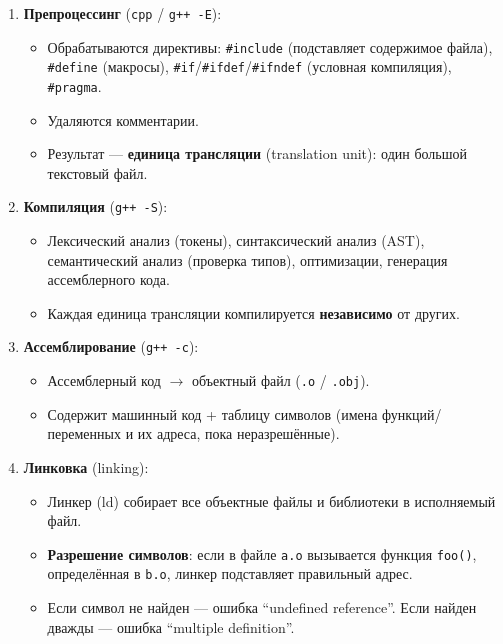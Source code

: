 \documentclass[12pt,a4paper]{article}
\begin{document}
\begin{enumerate}
    \item \textbf{Препроцессинг} (\texttt{cpp} / \texttt{g++ -E}):
    \begin{itemize}
        \item Обрабатываются директивы: \texttt{\#include} (подставляет содержимое файла), \texttt{\#define} (макросы), \texttt{\#if}/\texttt{\#ifdef}/\texttt{\#ifndef} (условная компиляция), \texttt{\#pragma}.
        \item Удаляются комментарии.
        \item Результат --- \textbf{единица трансляции} (translation unit): один большой текстовый файл.
    \end{itemize}

    \item \textbf{Компиляция} (\texttt{g++ -S}):
    \begin{itemize}
        \item Лексический анализ (токены), синтаксический анализ (AST), семантический анализ (проверка типов), оптимизации, генерация ассемблерного кода.
        \item Каждая единица трансляции компилируется \textbf{независимо} от других.
    \end{itemize}

    \item \textbf{Ассемблирование} (\texttt{g++ -c}):
    \begin{itemize}
        \item Ассемблерный код $\to$ объектный файл (\texttt{.o} / \texttt{.obj}).
        \item Содержит машинный код + таблицу символов (имена функций/переменных и их адреса, пока неразрешённые).
    \end{itemize}

    \item \textbf{Линковка} (linking):
    \begin{itemize}
        \item Линкер (ld) собирает все объектные файлы и библиотеки в исполняемый файл.
        \item \textbf{Разрешение символов}: если в файле \texttt{a.o} вызывается функция \texttt{foo()}, определённая в \texttt{b.o}, линкер подставляет правильный адрес.
        \item Если символ не найден --- ошибка ``undefined reference''. Если найден дважды --- ошибка ``multiple definition''.
    \end{itemize}
\end{enumerate}
\end{document}
